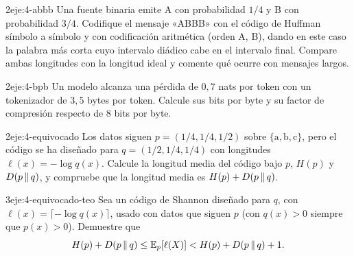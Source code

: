 \begin{ejercicio}{2}{eje:4-abbb}
Una fuente binaria emite A con probabilidad $1/4$ y B con probabilidad $3/4$. Codifique el mensaje «ABBB» con el código de Huffman símbolo a símbolo y con codificación aritmética (orden A, B), dando en este caso la palabra más corta cuyo intervalo diádico cabe en el intervalo final. Compare ambas longitudes con la longitud ideal y comente qué ocurre con mensajes largos.
\end{ejercicio}

\begin{ejercicio}{2}{eje:4-bpb}
Un modelo alcanza una pérdida de $0{,}7$ nats por token con un tokenizador de $3{,}5$ bytes por token. Calcule sus bits por byte y su factor de compresión respecto de 8 bits por byte.
\end{ejercicio}

\begin{ejercicio}{2}{eje:4-equivocado}
Los datos siguen $p=(1/4,1/4,1/2)$ sobre $\{\mathrm{a},\mathrm{b},\mathrm{c}\}$, pero el código se ha diseñado para $q=(1/2,1/4,1/4)$ con longitudes $\ell(x)=-\log q(x)$. Calcule la longitud media del código bajo $p$, $H(p)$ y $D(p\,\|\,q)$, y compruebe que la longitud media es $H(p)+D(p\,\|\,q)$.
\end{ejercicio}

\begin{ejercicio}{3}{eje:4-equivocado-teo}
Sea un código de Shannon diseñado para $q$, con $\ell(x)=\lceil-\log q(x)\rceil$, usado con datos que siguen $p$ (con $q(x)>0$ siempre que $p(x)>0$). Demuestre que
\[
H(p)+D(p\,\|\,q)\le\mathbb{E}_{p}[\ell(X)]<H(p)+D(p\,\|\,q)+1.
\]
\end{ejercicio}
